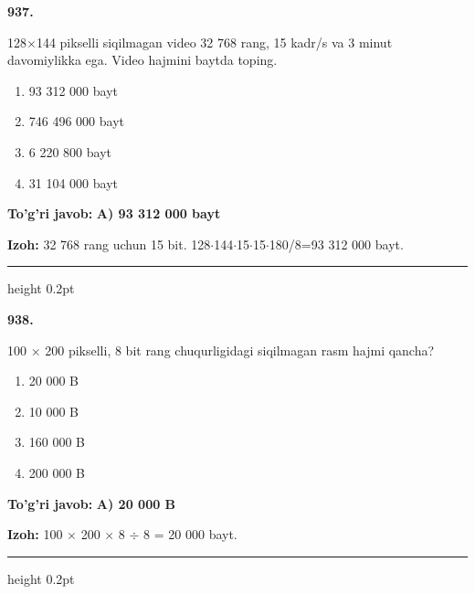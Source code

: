 \documentclass[10pt,a4paper,oneside]{article}
\begin{document}
\noindent\textbf{\color{ink}937.}
\par
128\ensuremath{\times}144 pikselli siqilmagan video 32 768 rang, 15 kadr/s va 3 minut davomiylikka ega. Video hajmini baytda toping.
\begin{enumerate}[label=\Alph*),leftmargin=9mm]
\item 93 312 000 bayt
\item 746 496 000 bayt
\item 6 220 800 bayt
\item 31 104 000 bayt
\end{enumerate}
\begin{tcolorbox}[enhanced,breakable,colback=teal!4,colframe=teal!50!black,boxrule=0.5pt,arc=1.1mm,left=3mm,right=3mm,top=1.7mm,bottom=1.7mm,before skip=2mm,after skip=2mm]
\textbf{\color{teal}To'g'ri javob:} \textbf{A) 93 312 000 bayt}
\par\smallskip
\textbf{Izoh:} 32 768 rang uchun 15 bit. 128\ensuremath{\cdot}144\ensuremath{\cdot}15\ensuremath{\cdot}15\ensuremath{\cdot}180/8=93 312 000 bayt.
\end{tcolorbox}
\vspace{2mm}\hrule height 0.2pt \vspace{3mm}

\noindent\textbf{\color{ink}938.}
\par
100 \ensuremath{\times} 200 pikselli, 8 bit rang chuqurligidagi siqilmagan rasm hajmi qancha?
\begin{enumerate}[label=\Alph*),leftmargin=9mm]
\item 20 000 B
\item 10 000 B
\item 160 000 B
\item 200 000 B
\end{enumerate}
\begin{tcolorbox}[enhanced,breakable,colback=teal!4,colframe=teal!50!black,boxrule=0.5pt,arc=1.1mm,left=3mm,right=3mm,top=1.7mm,bottom=1.7mm,before skip=2mm,after skip=2mm]
\textbf{\color{teal}To'g'ri javob:} \textbf{A) 20 000 B}
\par\smallskip
\textbf{Izoh:} 100 \ensuremath{\times} 200 \ensuremath{\times} 8 \ensuremath{\div} 8 = 20 000 bayt.
\end{tcolorbox}
\vspace{2mm}\hrule height 0.2pt \vspace{3mm}
\end{document}
